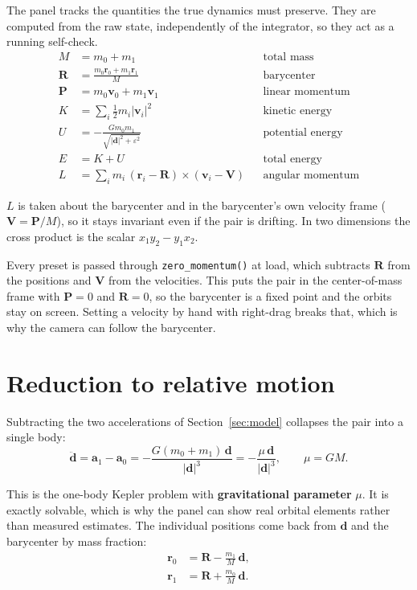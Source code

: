 \documentclass[11pt,a4paper]{article}
\newcommand{\vd}{\mathbf{d}}
\newcommand{\vr}{\mathbf{r}}
\newcommand{\vv}{\mathbf{v}}
\newcommand{\va}{\mathbf{a}}
\newcommand{\vP}{\mathbf{P}}
\newcommand{\vR}{\mathbf{R}}
\newcommand{\vV}{\mathbf{V}}
\begin{document}
The panel tracks the quantities the true dynamics must preserve. They are
computed from the raw state, independently of the integrator, so they act as a
running self-check.
\begin{align*}
  M    &= m_0 + m_1 &&\text{total mass}\\
  \vR  &= \frac{m_0\vr_0 + m_1\vr_1}{M} &&\text{barycenter}\\
  \vP  &= m_0\vv_0 + m_1\vv_1 &&\text{linear momentum}\\
  K    &= \sum_i \tfrac12 m_i |\vv_i|^{2} &&\text{kinetic energy}\\
  U    &= -\frac{G m_0 m_1}{\sqrt{|\vd|^{2}+\varepsilon^{2}}} &&\text{potential energy}\\
  E    &= K + U &&\text{total energy}\\
  L    &= \sum_i m_i \,(\vr_i - \vR) \times (\vv_i - \vV) &&\text{angular momentum}
\end{align*}

$L$ is taken about the barycenter and in the barycenter's own velocity frame
($\vV = \vP/M$), so it stays invariant even if the pair is drifting. In two
dimensions the cross product is the scalar $x_1 y_2 - y_1 x_2$.

Every preset is passed through \texttt{zero\_momentum()} at load, which subtracts
$\vR$ from the positions and $\vV$ from the velocities. This puts the pair in the
center-of-mass frame with $\vP = 0$ and $\vR = 0$, so the barycenter is a fixed
point and the orbits stay on screen. Setting a velocity by hand with right-drag
breaks that, which is why the camera can follow the barycenter.

\section{Reduction to relative motion}
\label{sec:relative}

Subtracting the two accelerations of Section~\ref{sec:model} collapses the pair
into a single body:
\[
  \ddot{\vd} = \va_1 - \va_0
             = -\frac{G(m_0+m_1)\,\vd}{|\vd|^{3}}
             = -\frac{\mu\,\vd}{|\vd|^{3}},
  \qquad \mu = G M .
\]

This is the one-body Kepler problem with \textbf{gravitational parameter} $\mu$.
It is exactly solvable, which is why the panel can show real orbital elements
rather than measured estimates. The individual positions come back from $\vd$
and the barycenter by mass fraction:
\begin{align}
  \vr_0 &= \vR - \frac{m_1}{M}\,\vd, \label{eq:split0}\\
  \vr_1 &= \vR + \frac{m_0}{M}\,\vd. \label{eq:split1}
\end{align}
\end{document}
